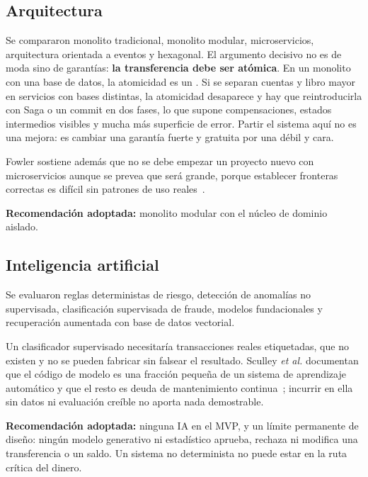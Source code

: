 \subsection{Arquitectura}

Se compararon monolito tradicional, monolito modular, microservicios,
arquitectura orientada a eventos y hexagonal. El argumento decisivo no es de
moda sino de garantías: \textbf{la transferencia debe ser atómica}. En un
monolito con una base de datos, la atomicidad es un . Si se
separan cuentas y libro mayor en servicios con bases distintas, la atomicidad
desaparece y hay que reintroducirla con Saga o un commit en dos fases, lo que
supone compensaciones, estados intermedios visibles y mucha más superficie de
error. Partir el sistema aquí no es una mejora: es cambiar una garantía fuerte
y gratuita por una débil y cara.

Fowler sostiene además que no se debe empezar un proyecto nuevo con
microservicios aunque se prevea que será grande, porque establecer fronteras
correctas es difícil sin patrones de uso reales~\cite{fowler2015}.

\textbf{Recomendación adoptada:} monolito modular con el núcleo de dominio
aislado.

\subsection{Inteligencia artificial}

Se evaluaron reglas deterministas de riesgo, detección de anomalías no
supervisada, clasificación supervisada de fraude, modelos fundacionales y
recuperación aumentada con base de datos vectorial.

Un clasificador supervisado necesitaría transacciones reales etiquetadas, que
no existen y no se pueden fabricar sin falsear el resultado. Sculley
\emph{et al.} documentan que el código de modelo es una fracción pequeña de un
sistema de aprendizaje automático y que el resto es deuda de mantenimiento
continua~\cite{sculley2015}; incurrir en ella sin datos ni evaluación creíble
no aporta nada demostrable.

\textbf{Recomendación adoptada:} ninguna IA en el MVP, y un límite permanente
de diseño: ningún modelo generativo ni estadístico aprueba, rechaza ni
modifica una transferencia o un saldo. Un sistema no determinista no puede
estar en la ruta crítica del dinero.
